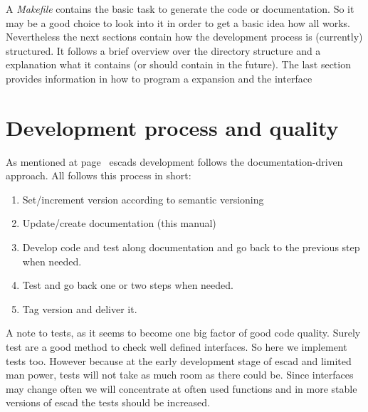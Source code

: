 \documentclass[a4paper, 12pt, openany]{scrbook}
\begin{document}
A \emph{Makefile} contains the basic task to generate the code or documentation. So it may be a good choice to look into it in order to get a basic idea how all works. Nevertheless the next sections contain how the development process is (currently) structured. It follows a brief overview over the directory structure and a explanation what it contains (or should contain in the future). The last section provides information in how to program a expansion and the interface
\section{Development process and quality}
As mentioned at page~\pageref{sec:ddd} escads development follows the documentation-driven approach.
All follows this process in short:
\begin{enumerate}
\item Set/increment version according to semantic versioning \parencite{web:semver}
\item Update/create documentation (this manual)
\item Develop code and test along documentation and go back to the previous step when needed.
\item Test and go back one or two steps when needed.
\item Tag version and deliver it.
\end{enumerate}
A note to tests, as it seems to become one big factor of good code quality. Surely test are a good method to check well defined interfaces. So here we implement tests too. However because at the early development stage of escad and limited man power, tests will not take as much room as there could be. Since interfaces may change often we will concentrate at often used functions and in more stable versions of escad the tests should be increased.
\end{document}
